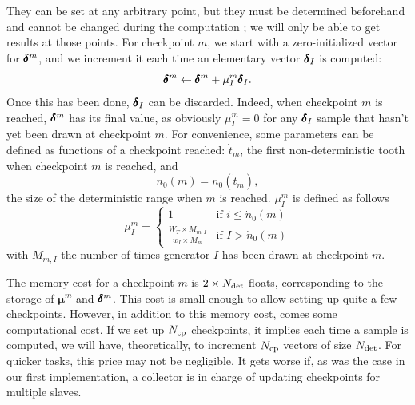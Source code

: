 \documentclass[./thesis.tex]{subfiles}
\begin{document}
They can be set at any arbitrary point, but they must be determined beforehand and cannot be changed during the computation ; we will only be able to get results at those points.
For checkpoint $m$, we start with a zero-initialized vector for $\pmb \delta^m$, and
we increment it each time an elementary vector $\pmb \delta_I$ is computed:
\begin{equation}
\pmb \delta^m \gets \pmb \delta^m + \mu_I^{m} \pmb \delta_I.
\end{equation}
Once this has been done, $\pmb \delta_I$ can be discarded. Indeed, when checkpoint $m$ is reached, $\pmb \delta^{m}$ has its final value, as obviously $\mu_I^{m} = 0$ for any $\pmb \delta_I$ sample that hasn't yet been drawn at checkpoint $m$.
For convenience, some parameters can be defined as functions of a checkpoint reached:
$\dot t_m$, the first non-deterministic tooth when checkpoint $m$ is reached, and
\begin{equation}
\dot n_0(m) = n_0(\dot t_m),
\end{equation}
the size of the deterministic range when $m$ is reached.
$\mu^m_I$ is defined as follows
\begin{equation}
\mu^m_I = 
\begin{cases}
1 & \text{if } i \leq \dot n_0(m) \\
\frac{W_T \times M_{m,I}}{w_I \times M_m} & \text{if } I > \dot n_0(m)
\end{cases}
\end{equation}
with $M_{m,I}$ the number of times generator $I$ has been drawn at checkpoint $m$.


The memory cost for a checkpoint $m$ is $2 \times {N_\text{det}}$ floats, corresponding to the storage of ${\pmb \mu}^m$ and $\pmb \delta^m$. This cost is small enough to allow setting up quite a few checkpoints. However, in addition to this memory cost, comes some computational cost. If we set up ${N_\text{cp}}$ checkpoints, it implies each time a sample is computed, we will have, theoretically, to increment ${N_\text{cp}}$ vectors of size ${N_\text{det}}$. For quicker tasks, this price may not be negligible. It gets worse if, as was the case in our first implementation, a collector is in charge of updating checkpoints for multiple slaves. 
\end{document}
